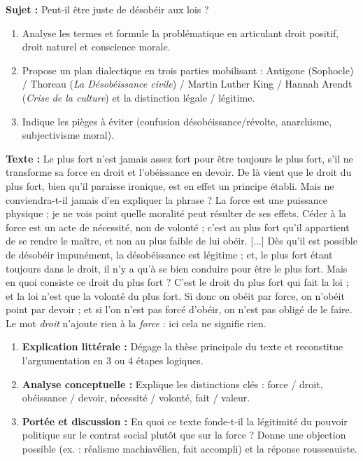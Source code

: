\documentclass[11pt]{article}
\newcommand{\cle}[1]{{\popxbold\color{popdark}#1}}
\begin{document}
\begin{exercice}
\textbf{Sujet :} \guillemotleft Peut-il être juste de désobéir aux lois ? \guillemotright
\begin{enumerate}
    \item Analyse les termes et formule la problématique en articulant \cle{droit positif}, \cle{droit naturel} et \cle{conscience morale}.
    \item Propose un plan dialectique en trois parties mobilisant : Antigone (Sophocle) / Thoreau (\emph{La Désobéissance civile}) / Martin Luther King / Hannah Arendt (\emph{Crise de la culture}) et la distinction légale / légitime.
    \item Indique les pièges à éviter (confusion désobéissance/révolte, anarchisme, subjectivisme moral).
\end{enumerate}
\end{exercice}

\begin{exercice}
\textbf{Texte :}
\guillemotleft Le plus fort n'est jamais assez fort pour être toujours le plus fort, s'il ne transforme sa force en droit et l'obéissance en devoir. De là vient que le droit du plus fort, bien qu'il paraisse ironique, est en effet un principe établi. Mais ne conviendra-t-il jamais d'en expliquer la phrase ? La force est une puissance physique ; je ne vois point quelle moralité peut résulter de ses effets. Céder à la force est un acte de nécessité, non de volonté ; c'est au plus fort qu'il appartient de se rendre le maître, et non au plus faible de lui obéir. [...] Dès qu'il est possible de désobéir impunément, la désobéissance est légitime ; et, le plus fort étant toujours dans le droit, il n'y a qu'à se bien conduire pour être le plus fort. Mais en quoi consiste ce droit du plus fort ? C'est le droit du plus fort qui fait la loi ; et la loi n'est que la volonté du plus fort. Si donc on obéit par force, on n'obéit point par devoir ; et si l'on n'est pas forcé d'obéir, on n'est pas obligé de le faire. Le mot \emph{droit} n'ajoute rien à la \emph{force} : ici cela ne signifie rien. \guillemotright
\begin{enumerate}
    \item \textbf{Explication littérale :} Dégage la thèse principale du texte et reconstitue l'argumentation en 3 ou 4 étapes logiques.
    \item \textbf{Analyse conceptuelle :} Explique les distinctions clés : force / droit, obéissance / devoir, nécessité / volonté, fait / valeur.
    \item \textbf{Portée et discussion :} En quoi ce texte fonde-t-il la \cle{légitimité} du pouvoir politique sur le \cle{contrat social} plutôt que sur la \cle{force} ? Donne une objection possible (ex. : réalisme machiavélien, fait accompli) et la réponse rousseauiste.
\end{enumerate}
\end{exercice}
\end{document}
